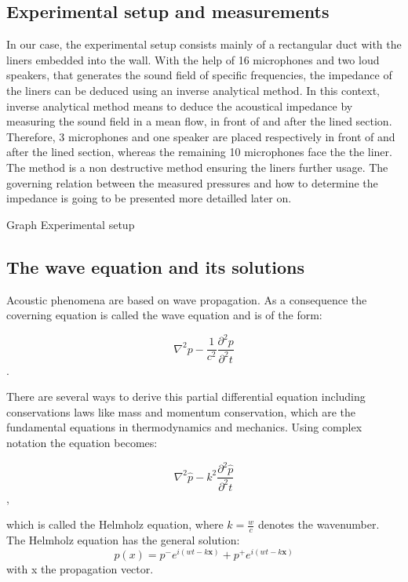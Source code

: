 \documentclass[11pt]{report} %
\begin{document}
\subsection{Experimental setup and measurements}
In our case, the experimental setup consists mainly of a rectangular duct with the liners embedded into the wall.
With the help of 16 microphones and two loud speakers, that generates the sound field of specific frequencies, the impedance of the liners can be deduced using an inverse analytical method.
In this context, inverse analytical method means to deduce the acoustical impedance by measuring the sound field in a mean flow, in front of and after the lined section.
Therefore, 3 microphones and one speaker are placed respectively in front of and after the lined section, whereas the remaining 10 microphones face the the liner.
The method is a non destructive method ensuring the liners further usage.
The governing relation between the measured pressures and how to determine the impedance is going to be presented more detailled later on. 

Graph Experimental setup
	

\subsection{The wave equation and its solutions}
Acoustic phenomena are based on wave propagation. As a consequence the coverning equation is called the wave equation and is of the form: 

\begin{equation}
\nabla^2p-\frac{1}{c^2}\frac{\partial^2p}{\partial^2t}
\end{equation}. 

There are several ways to derive this partial differential equation including conservations laws like mass and momentum conservation, which are the fundamental equations in thermodynamics and mechanics. 
Using complex notation the equation becomes: 

\begin{equation}
\nabla^2 \hat{p}-k^2 \frac{\partial^2\hat{p}}{\partial^2t}
\end{equation},  

which is called the Helmholz equation, where $k=\frac{w}{c}$ denotes the wavenumber. 
The Helmholz equation has the general solution:
\begin{equation}
p(x)=p^{-}e^{i(wt-k\textbf{x})}+p^{+}e^{i(wt-k\textbf{x})}
\end{equation}
with x the propagation vector. 
\end{document}
